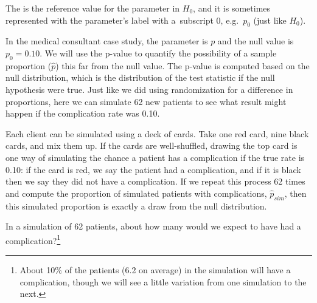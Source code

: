 
\begin{termBox}{
The  is the reference value for the parameter in $H_0$, and it is sometimes represented with the parameter's label with a~subscript 0, e.g.~$p_0$ (just like $H_0$).}
\end{termBox}

In the medical consultant case study, the parameter is $p$ and the null value is $p_0 = 0.10$. We will use the p-value to quantify the possibility of a sample proportion ($\hat{p}$) this far from the null value. The p-value is computed based on the null distribution, which is the distribution of the test statistic if the null hypothesis were true. Just like we did using randomization for a difference in proportions, here we can simulate 62 new patients to see what result might happen if the complication rate was 0.10.

Each client can be simulated using a deck of cards. Take one red card, nine black cards, and mix them up. If the cards are well-shuffled, drawing the top card is one way of simulating the chance a patient has a complication if the true rate is 0.10: if the card is red, we say the patient had a complication, and if it is black then we say they did not have a complication. If we repeat this process 62 times and compute the proportion of simulated patients with complications, $\hat{p}_{sim}$, then this simulated proportion is exactly a draw from the null distribution.

\begin{exercise}
In a simulation of 62 patients, about how many would we expect to have had a complication?\footnote{About 10\% of the patients (6.2 on average) in the simulation will have a complication, though we will see a little variation from one simulation to the next.}
\end{exercise}

